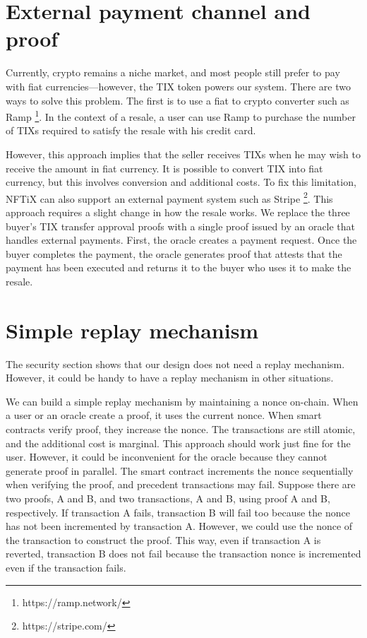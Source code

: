 \documentclass[a4paper,11pt,oneside]{report}
\begin{document}
\section{External payment channel and proof}
Currently, crypto remains a niche market, and most people still prefer to pay with fiat currencies—however, the TIX token powers our system. There are two ways to solve this problem. The first is to use a fiat to crypto converter such as Ramp \footnote{https://ramp.network/}. In the context of a resale, a user can use Ramp to purchase the number of TIXs required to satisfy the resale with his credit card. 

However, this approach implies that the seller receives TIXs when he may wish to receive the amount in fiat currency. It is possible to convert TIX into fiat currency, but this involves conversion and additional costs. To fix this limitation, NFTiX can also support an external payment system such as Stripe \footnote{https://stripe.com/}. This approach requires a slight change in how the resale works. We replace the three buyer's TIX transfer approval proofs with a single proof issued by an oracle that handles external payments. First, the oracle creates a payment request. Once the buyer completes the payment, the oracle generates proof that attests that the payment has been executed and returns it to the buyer who uses it to make the resale.

\section{Simple replay mechanism}
The security section shows that our design does not need a replay mechanism. However, it could be handy to have a replay mechanism in other situations. 

We can build a simple replay mechanism by maintaining a nonce on-chain. When a user or an oracle create a proof, it uses the current nonce. When smart contracts verify proof, they increase the nonce. The transactions are still atomic, and the additional cost is marginal. This approach should work just fine for the user. However, it could be inconvenient for the oracle because they cannot generate proof in parallel. The smart contract increments the nonce sequentially when verifying the proof, and precedent transactions may fail. Suppose there are two proofs, A and B, and two transactions, A and B, using proof A and B, respectively. If transaction A fails, transaction B will fail too because the nonce has not been incremented by transaction A. However, we could use the nonce of the transaction to construct the proof. This way, even if transaction A is reverted, transaction B does not fail because the transaction nonce is incremented even if the transaction fails.
\end{document}
